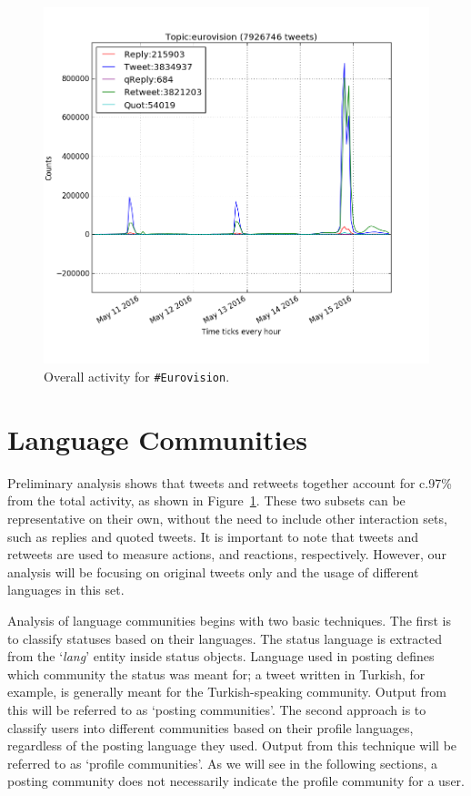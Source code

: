 \documentclass[conference]{IEEEtran}
\begin{document}
\begin{figure}[!htb]
\centering
\includegraphics[width=\columnwidth]{images/overallactivity.png}
\caption{Overall activity for {\texttt{\#Eurovision}}.}
\label{fig:overallactivity}
\end{figure}


\section{Language Communities}\label{langcomm}

Preliminary analysis shows that tweets and retweets together account
for c.97\% from the total activity, as shown in
Figure~\ref{fig:overallactivity}. These two subsets can be
representative on their own, without the need to include other
interaction sets, such as replies and quoted tweets. It is important
to note that tweets and retweets are used to measure actions, and
reactions, respectively. However, our analysis will be focusing on
original tweets only and the usage of different languages in this set.

Analysis of language communities begins with two basic techniques. The
first is to classify statuses based on their languages. The status
language is extracted from the `{\emph{lang}}' entity inside status
objects. Language used in posting defines which community the status
was meant for; a tweet written in Turkish, for example, is generally
meant for the Turkish-speaking community. Output from this will be
referred to as `posting communities'. The second approach is to
classify users into different communities based on their profile
languages, regardless of the posting language they used. Output from
this technique will be referred to as `profile communities'. As we
will see in the following sections, a posting community does not
necessarily indicate the profile community for a user.
\end{document}
